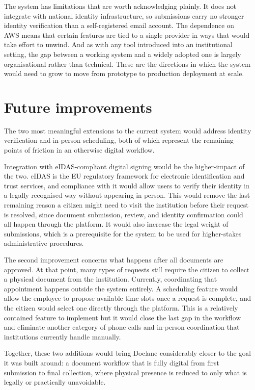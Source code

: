 \par The system has limitations that are worth acknowledging plainly. It does not integrate with national identity infrastructure, so submissions carry no stronger identity verification than a self-registered email account. The dependence on AWS means that certain features are tied to a single provider in ways that would take effort to unwind. And as with any tool introduced into an institutional setting, the gap between a working system and a widely adopted one is largely organisational rather than technical. These are the directions in which the system would need to grow to move from prototype to production deployment at scale.

\section{Future improvements}

\par The two most meaningful extensions to the current system would address identity verification and in-person scheduling, both of which represent the remaining points of friction in an otherwise digital workflow.

\par Integration with eIDAS-compliant digital signing would be the higher-impact of the two. eIDAS is the EU regulatory framework for electronic identification and trust services, and compliance with it would allow users to verify their identity in a legally recognised way without appearing in person. This would remove the last remaining reason a citizen might need to visit the institution before their request is resolved, since document submission, review, and identity confirmation could all happen through the platform. It would also increase the legal weight of submissions, which is a prerequisite for the system to be used for higher-stakes administrative procedures.

\par The second improvement concerns what happens after all documents are approved. At that point, many types of requests still require the citizen to collect a physical document from the institution. Currently, coordinating that appointment happens outside the system entirely. A scheduling feature would allow the employee to propose available time slots once a request is complete, and the citizen would select one directly through the platform. This is a relatively contained feature to implement but it would close the last gap in the workflow and eliminate another category of phone calls and in-person coordination that institutions currently handle manually.

\par Together, these two additions would bring Doclane considerably closer to the goal it was built around: a document workflow that is fully digital from first submission to final collection, where physical presence is reduced to only what is legally or practically unavoidable.